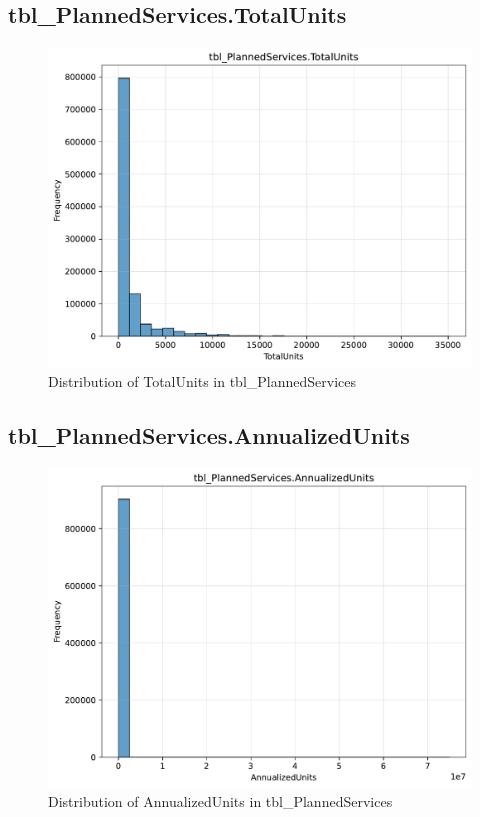 \subsection{tbl\_PlannedServices.TotalUnits}

\begin{figure}[htbp]
\centering
\includegraphics[width=\textwidth]{figures/dbo_tbl_PlannedServices_TotalUnits.pdf}
\caption{Distribution of TotalUnits in tbl\_PlannedServices}
\end{figure}\newpage

\subsection{tbl\_PlannedServices.AnnualizedUnits}

\begin{figure}[htbp]
\centering
\includegraphics[width=\textwidth]{figures/dbo_tbl_PlannedServices_AnnualizedUnits.pdf}
\caption{Distribution of AnnualizedUnits in tbl\_PlannedServices}
\end{figure}\newpage

